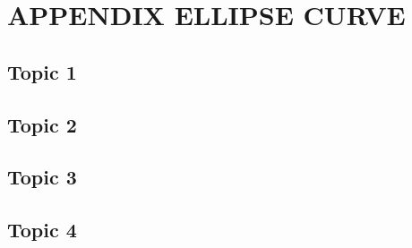 \section{\textbf{APPENDIX ELLIPSE CURVE}} \label{APPENDIX ELLIPSE CURVE}


\subsection{Topic 1}


\subsection{Topic 2}



\subsection{Topic 3}


\subsection{Topic 4}






\clearpage
\pagebreak

